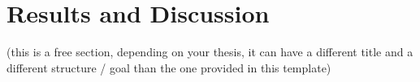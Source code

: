 \chapter{Results and Discussion}
\label{chap::resultsanddiscussion}

(this is a free section, depending on your thesis, it can have a different title and a different structure / goal than the one provided in this template)



